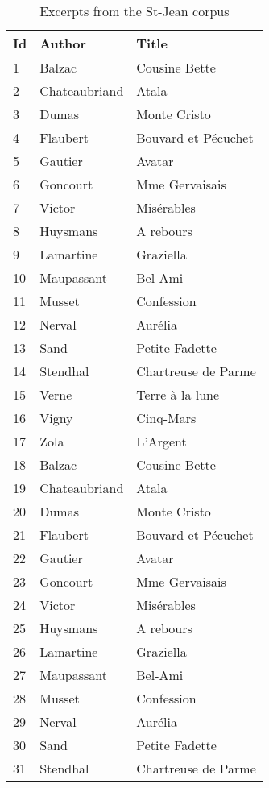 \begin{table}
  \caption{Excerpts from the St-Jean corpus}
  \label{tbl:st_jean_corpus}
  \begin{tabular}{|l|l|l|}
    \hline
    \textbf{Id} & \textbf{Author} & \textbf{Title} \\ \hline
    \color{red}{Manque 101-200 !}
    1 & Balzac & Cousine Bette \\
    2 & Chateaubriand & Atala \\
    3 & Dumas & Monte Cristo \\
    4 & Flaubert & Bouvard et Pécuchet \\
    5 & Gautier & Avatar \\
    6 & Goncourt & Mme Gervaisais \\
    7 & Victor & Misérables \\
    8 & Huysmans & A rebours \\
    9 & Lamartine & Graziella \\
    10 & Maupassant & Bel-Ami \\
    11 & Musset & Confession \\
    12 & Nerval & Aurélia \\
    13 & Sand & Petite Fadette \\
    14 & Stendhal & Chartreuse de Parme \\
    15 & Verne & Terre à la lune \\
    16 & Vigny & Cinq-Mars \\
    17 & Zola & L'Argent \\
    18 & Balzac & Cousine Bette \\
    19 & Chateaubriand & Atala \\
    20 & Dumas & Monte Cristo \\
    21 & Flaubert & Bouvard et Pécuchet \\
    22 & Gautier & Avatar \\
    23 & Goncourt & Mme Gervaisais \\
    24 & Victor & Misérables \\
    25 & Huysmans & A rebours \\
    26 & Lamartine & Graziella \\
    27 & Maupassant & Bel-Ami \\
    28 & Musset & Confession \\
    29 & Nerval & Aurélia \\
    30 & Sand & Petite Fadette \\
    31 & Stendhal & Chartreuse de Parme \\

\end{tabular}
\end{table}
